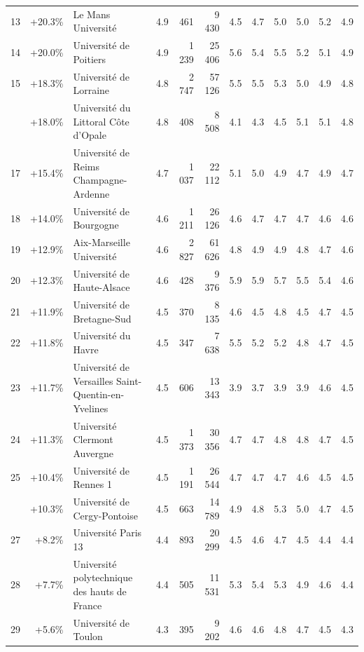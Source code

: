 \documentclass[12pt,french,landscape]{article}
\begin{document}
\begin{longtable}{rrlrrrrrrlrr}
\rowcolor{gray!6}  13 & +20.3\% & Le Mans Université & 4.9 & 461 & 9 430 & 4.5 & 4.7 & 5.0 & 5.0 & 5.2 & 4.9\\
14 & +20.0\% & Université de Poitiers & 4.9 & 1 239 & 25 406 & 5.6 & 5.4 & 5.5 & 5.2 & 5.1 & 4.9\\
\rowcolor{gray!6}  15 & +18.3\% & Université de Lorraine & 4.8 & 2 747 & 57 126 & 5.5 & 5.5 & 5.3 & 5.0 & 4.9 & 4.8\\
\addlinespace
16 & +18.0\% & Université du Littoral Côte d'Opale & 4.8 & 408 & 8 508 & 4.1 & 4.3 & 4.5 & 5.1 & 5.1 & 4.8\\
\rowcolor{gray!6}  17 & +15.4\% & Université de Reims Champagne-Ardenne & 4.7 & 1 037 & 22 112 & 5.1 & 5.0 & 4.9 & 4.7 & 4.9 & 4.7\\
18 & +14.0\% & Université de Bourgogne & 4.6 & 1 211 & 26 126 & 4.6 & 4.7 & 4.7 & 4.7 & 4.6 & 4.6\\
\rowcolor{gray!6}  19 & +12.9\% & Aix-Marseille Université & 4.6 & 2 827 & 61 626 & 4.8 & 4.9 & 4.9 & 4.8 & 4.7 & 4.6\\
20 & +12.3\% & Université de Haute-Alsace & 4.6 & 428 & 9 376 & 5.9 & 5.9 & 5.7 & 5.5 & 5.4 & 4.6\\
\addlinespace
\rowcolor{gray!6}  21 & +11.9\% & Université de Bretagne-Sud & 4.5 & 370 & 8 135 & 4.6 & 4.5 & 4.8 & 4.5 & 4.7 & 4.5\\
22 & +11.8\% & Université du Havre & 4.5 & 347 & 7 638 & 5.5 & 5.2 & 5.2 & 4.8 & 4.7 & 4.5\\
\rowcolor{gray!6}  23 & +11.7\% & Université de Versailles Saint-Quentin-en-Yvelines & 4.5 & 606 & 13 343 & 3.9 & 3.7 & 3.9 & 3.9 & 4.6 & 4.5\\
24 & +11.3\% & Université Clermont Auvergne & 4.5 & 1 373 & 30 356 & 4.7 & 4.7 & 4.8 & 4.8 & 4.7 & 4.5\\
\rowcolor{gray!6}  25 & +10.4\% & Université de Rennes 1 & 4.5 & 1 191 & 26 544 & 4.7 & 4.7 & 4.7 & 4.6 & 4.5 & 4.5\\
\addlinespace
26 & +10.3\% & Université de Cergy-Pontoise & 4.5 & 663 & 14 789 & 4.9 & 4.8 & 5.3 & 5.0 & 4.7 & 4.5\\
\rowcolor{gray!6}  27 & +8.2\% & Université Paris 13 & 4.4 & 893 & 20 299 & 4.5 & 4.6 & 4.7 & 4.5 & 4.4 & 4.4\\
28 & +7.7\% & Université polytechnique des hauts de France & 4.4 & 505 & 11 531 & 5.3 & 5.4 & 5.3 & 4.9 & 4.6 & 4.4\\
\rowcolor{gray!6}  29 & +5.6\% & Université de Toulon & 4.3 & 395 & 9 202 & 4.6 & 4.6 & 4.8 & 4.7 & 4.5 & 4.3\\

\end{longtable}
\end{document}
